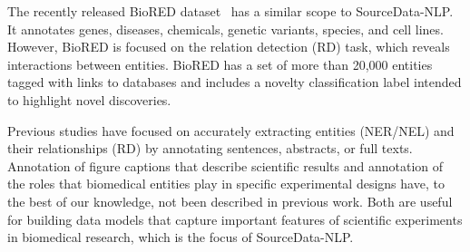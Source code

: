 \documentclass{bioinfo}
\begin{document}
The recently released BioRED dataset~\citep{biored} has a similar scope to SourceData-NLP. It annotates genes, diseases, chemicals, genetic variants, species, and cell lines. However, BioRED is focused on the relation detection (RD) task, which reveals interactions between entities. BioRED has a set of more than 20,000 entities tagged with links to databases and includes a novelty classification label intended to highlight novel discoveries.

Previous studies have focused on accurately extracting entities (NER/NEL) and their relationships (RD) by annotating sentences, abstracts, or full texts. Annotation of figure captions that describe scientific results and annotation of the roles that biomedical entities play in specific experimental designs have, to the best of our knowledge, not been described in previous work. Both are useful for building data models that capture important features of scientific experiments in biomedical research, which is the focus of SourceData-NLP.
\end{document}
